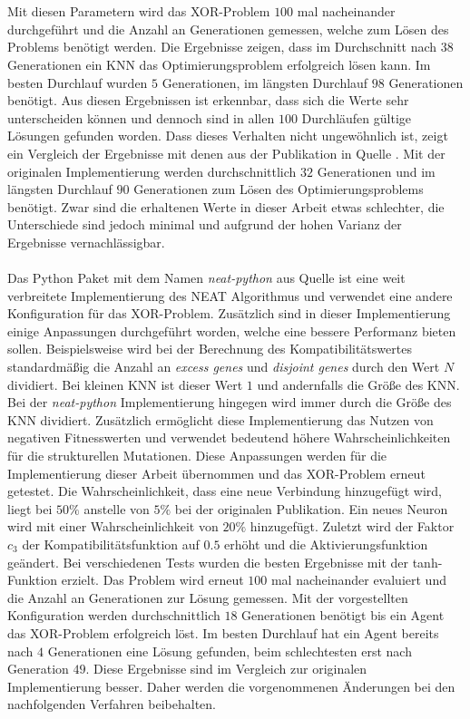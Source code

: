 \\\\ %
Mit diesen Parametern wird das XOR-Problem $100$ mal nacheinander durchgeführt und die Anzahl an Generationen gemessen, welche zum Lösen des Problems benötigt werden. Die Ergebnisse zeigen, dass im Durchschnitt nach $38$ Generationen ein \ac{KNN} das Optimierungsproblem erfolgreich lösen kann. Im besten Durchlauf wurden $5$ Generationen, im längsten Durchlauf $98$ Generationen benötigt. Aus diesen Ergebnissen ist erkennbar, dass sich die Werte sehr unterscheiden können und dennoch sind in allen $100$ Durchläufen gültige Lösungen gefunden worden. Dass dieses Verhalten nicht ungewöhnlich ist, zeigt ein Vergleich der Ergebnisse mit denen aus der Publikation in Quelle \cite{stanley2002evolving}. Mit der originalen Implementierung werden durchschnittlich $32$ Generationen und im längsten Durchlauf $90$ Generationen zum Lösen des Optimierungsproblems benötigt. Zwar sind die erhaltenen Werte in dieser Arbeit etwas schlechter, die Unterschiede sind jedoch minimal und aufgrund der hohen Varianz der Ergebnisse vernachlässigbar.
\\\\
Das Python Paket mit dem Namen \emph{neat-python} aus Quelle \cite{mcintyre_neatpython} ist eine weit verbreitete Implementierung des \ac{NEAT} Algorithmus und verwendet eine andere Konfiguration für das XOR-Problem. Zusätzlich sind in dieser Implementierung einige Anpassungen durchgeführt worden, welche eine bessere Performanz bieten sollen. Beispielsweise wird bei der Berechnung des Kompatibilitätswertes standardmäßig die Anzahl an \emph{excess genes} und \emph{disjoint genes} durch den Wert $N$ dividiert. Bei kleinen \ac{KNN} ist dieser Wert $1$ und andernfalls die Größe des \ac{KNN}. Bei der \emph{neat-python} Implementierung hingegen wird immer durch die Größe des \ac{KNN} dividiert. Zusätzlich ermöglicht diese Implementierung das Nutzen von negativen Fitnesswerten und verwendet bedeutend höhere Wahrscheinlichkeiten für die strukturellen Mutationen. Diese Anpassungen werden für die Implementierung dieser Arbeit übernommen und das XOR-Problem erneut getestet. Die Wahrscheinlichkeit, dass eine neue Verbindung hinzugefügt wird, liegt bei $50\%$ anstelle von $5\%$ bei der originalen Publikation. Ein neues Neuron wird mit einer Wahrscheinlichkeit von $20\%$ hinzugefügt. Zuletzt wird der Faktor $c_3$ der Kompatibilitätsfunktion auf $0.5$ erhöht und die Aktivierungsfunktion geändert. Bei verschiedenen Tests wurden die besten Ergebnisse mit der \ac{tanh}-Funktion erzielt. Das Problem wird erneut $100$ mal nacheinander evaluiert und die Anzahl an Generationen zur Lösung gemessen. Mit der vorgestellten Konfiguration werden durchschnittlich $18$ Generationen benötigt bis ein Agent das XOR-Problem erfolgreich löst. Im besten Durchlauf hat ein Agent bereits nach $4$ Generationen eine Lösung gefunden, beim schlechtesten erst nach Generation $49$. Diese Ergebnisse sind im Vergleich zur originalen Implementierung besser. Daher werden die vorgenommenen Änderungen bei den nachfolgenden Verfahren beibehalten.
